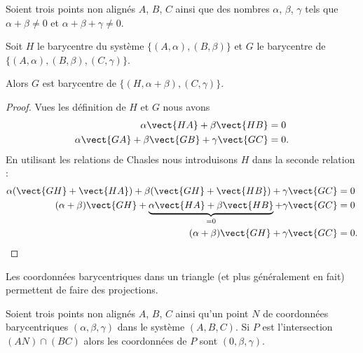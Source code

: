 \begin{lemma}
    Soient trois points non alignés \( A\), \( B\), \( C\) ainsi que des nombres \( \alpha\), \( \beta\), \( \gamma\) tels que \( \alpha+\beta\neq 0 \) et \( \alpha+\beta+\gamma\neq 0\).

    Soit \( H\) le barycentre du système \( \{ (A,\alpha),(B,\beta) \}\) et \( G\) le barycentre de \( \{ (A,\alpha), (B,\beta),(C,\gamma) \}\). 

    Alors \( G\) est barycentre de \( \{ (H,\alpha+\beta),(C,\gamma) \}\).
\end{lemma}

\begin{proof}
    Vues les définition de \( H\) et \( G\) nous avons
    \begin{subequations}
        \begin{align}
            \alpha\vect{ HA }+\beta\vect{ HB }&=0\\
            \alpha\vect{ GA }+\beta\vect{ GB }+\gamma\vect{ GC }&=0.
        \end{align}
    \end{subequations}
    En utilisant les relations de Chasles nous introduisons \( H\) dans la seconde relation :
    \begin{subequations}
        \begin{align}
            \alpha(\vect{ GH }+\vect{ HA })+\beta(\vect{ GH }+\vect{ HB })+\gamma\vect{ GC }&=0\\
            (\alpha+\beta)\vect{ GH }+\underbrace{  \alpha\vect{ HA }+\beta\vect{ HB }   }_{=0}+\gamma\vect{ GC }&=0\\
            (\alpha+\beta)\vect{ GH }+\gamma\vect{ GC }&=0.
        \end{align}
    \end{subequations}
\end{proof}

Les coordonnées barycentriques dans un triangle (et plus généralement en fait) permettent de faire des projections.

\begin{proposition}     \label{PROPooBCUVooWKttiH}
    Soient trois points non alignés \( A\), \( B\), \( C\) ainsi qu'un point \( N\) de coordonnées barycentriques  \( (\alpha,\beta,\gamma) \) dans le système $(A,B,C)$. Si \( P\) est l'intersection \( (AN)\cap(BC)\) alors les coordonnées de \( P\) sont \( (0,\beta,\gamma)\).
\end{proposition}

